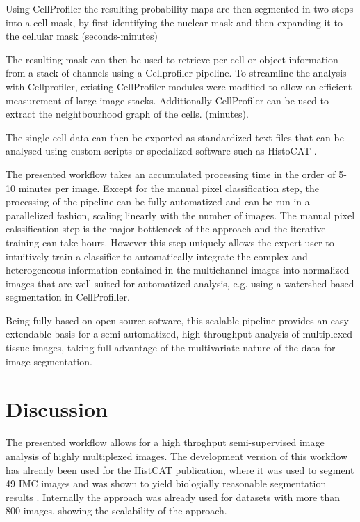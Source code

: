 \documentclass[a4paper]{article}
\begin{document}
Using CellProfiler the resulting probability maps are then segmented in two steps into a cell mask, by first
identifying the nuclear mask and then expanding it to the cellular mask (\texttildelow seconds-minutes)

The resulting mask can then be used to retrieve per-cell or object information from a stack of
channels using a Cellprofiler pipeline. To streamline the analysis with Cellprofiler, existing
CellProfiler modules were modified to allow an efficient measurement of large image stacks.
Additionally CellProfiler can be used to extract the neightbourhood graph of the cells. (\texttildelow minutes).

The single cell data can then be exported as standardized text files that can be analysed using
custom scripts or specialized software such as HistoCAT \cite{schapiro_histocat:_2017}.

The presented workflow takes an accumulated processing time in the order of 5-10 minutes per image.
Except for the manual pixel classification step, the processing of the pipeline can be fully
automatized and can be run in a parallelized fashion, scaling linearly with the number of images.
The manual pixel calssification step is the major bottleneck of the approach and the iterative
training can take hours. However this step uniquely allows the expert user to intuitively  train a classifier to
automatically integrate the complex and heterogeneous information contained in the multichannel images into
normalized images that are well suited for automatized analysis, e.g. using a watershed based
segmentation in CellProfiller.

Being fully based on open source sotware, this scalable pipeline provides an easy extendable basis
for a semi-automatized, high throughput analysis of multiplexed tissue images, taking full
advantage of the multivariate nature of the data for image segmentation. 

\section{Discussion}

The presented workflow allows for a high throghput semi-supervised image analysis of highly
multiplexed images.  The development version of this workflow has already been used for the HistCAT
publication, where it was used to segment 49 IMC images and was shown to yield biologially
reasonable segmentation
results \cite{schapiro_histocat:_2017}. Internally the
approach was already used for datasets with more than 800 images, showing the scalability of the
approach.
\end{document}
